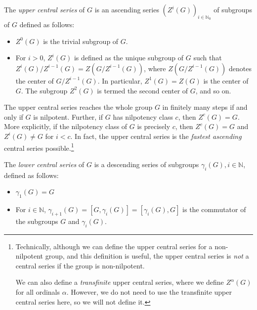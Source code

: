 The {\em upper central series} of $G$ is an ascending series
$(Z^i(G))_{i \in \mathbb{N}_0}$ of subgroups of $G$ defined as
follows:

\begin{itemize}
\item $Z^0(G)$ is the trivial subgroup of $G$.
\item For $i > 0$, $Z^i(G)$ is defined as the unique subgroup of $G$
  such that $Z^i(G)/Z^{i-1}(G) = Z(G/Z^{i-1}(G))$, where
  $Z(G/Z^{i-1}(G))$ denotes the center of $G/Z^{i-1}(G)$. In
  particular, $Z^1(G) = Z(G)$ is the center of $G$. The subgroup
  $Z^2(G)$ is termed the second center of $G$, and so on.
\end{itemize}

The upper central series reaches the whole group $G$ in finitely many
steps if and only if $G$ is nilpotent. Further, if $G$ has nilpotency
class $c$, then $Z^c(G) = G$. More explicitly, if the nilpotency class
of $G$ is precisely $c$, then $Z^c(G) = G$ and $Z^i(G) \ne G$ for $i <
c$. In fact, the upper central series is the {\em fastest ascending}
central series possible.\footnote{Technically, although we can define
  the upper central series for a non-nilpotent group, and this
  definition is useful, the upper central series is {\em not} a
  central series if the group is non-nilpotent.

We can also define a {\em transfinite} upper central series, where we
define $Z^\alpha(G)$ for all ordinals $\alpha$. However, we do not
need to use the transfinite upper central series here, so we will not
define it.}

The {\em lower central series} of $G$ is a descending series of
subgroups $\gamma_i(G), i \in \mathbb{N}$, defined as follows:

\begin{itemize}
\item $\gamma_1(G) = G$
\item For $i \in \mathbb{N}$, $\gamma_{i+1}(G) = [G,\gamma_i(G)] =
  [\gamma_i(G),G]$ is the commutator of the subgroups $G$ and
  $\gamma_i(G)$.
\end{itemize}

